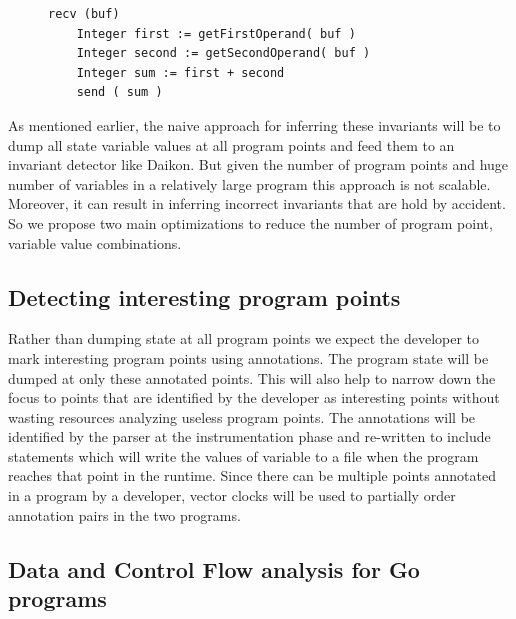 \begin{figure}
\begin{lstlisting}[caption={Sample code for Communication between 2 nodes - Node 1}, label=lst:node1]
    recv (buf)
    Integer first := getFirstOperand( buf )
    Integer second := getSecondOperand( buf )
    Integer sum := first + second
    send ( sum )
\end{lstlisting}
\end{figure}

As mentioned earlier, the naive approach for inferring these invariants will be to dump all
state variable values at all program points and feed them to an
invariant detector like Daikon\cite{ernst2007daikon}. But given the
number of program points and huge number of variables in a relatively
large program this approach is not scalable. Moreover, it can result in inferring incorrect invariants that are hold by accident. So we propose two main
optimizations to reduce the number of program point, variable value
combinations.

\subsection{Detecting interesting program points}

Rather than dumping state at all program points we expect the
developer to mark interesting program points using annotations. The
program state will be dumped at only these annotated points. This will
also help to narrow down the focus to points that are identified by
the developer as interesting points without wasting resources
analyzing useless program points. The annotations will be identified
by the parser at the instrumentation phase and re-written to include
statements which will write the values of variable to a file when the
program reaches that point in the runtime. Since there can be multiple points annotated in a program by a
developer, vector clocks will be used to partially order annotation
pairs in the two programs.%

\subsection{Data and Control Flow analysis for Go programs}

